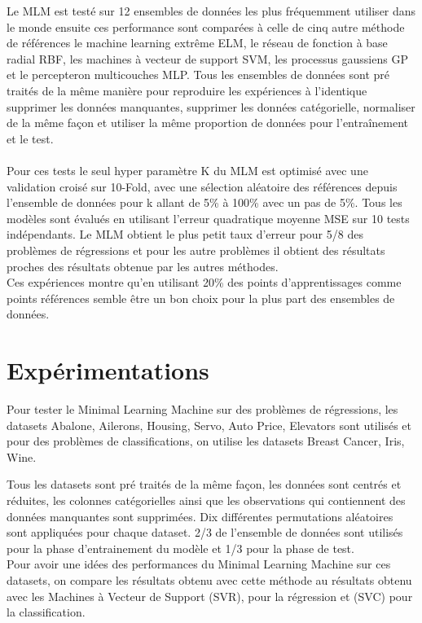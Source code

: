 \documentclass[12pt,a4paper]{report}
\begin{document}
\par Le MLM est testé sur 12 ensembles de données les plus fréquemment utiliser dans le monde ensuite ces performance sont comparées à celle de cinq autre  méthode de références le machine learning extrême ELM, le réseau de fonction à base radial RBF, les machines à vecteur de support SVM, les processus gaussiens GP et le percepteron multicouches MLP. Tous les ensembles de données sont pré traités de la même manière pour reproduire les expériences à l'identique supprimer les données manquantes, supprimer les données catégorielle, normaliser de la même façon et utiliser la même proportion de données pour l'entraînement et le test. \\ \\
Pour ces tests le seul hyper paramètre K du MLM est optimisé avec une validation croisé sur 10-Fold, avec une sélection aléatoire des références depuis l'ensemble de données pour k allant de 5\% à 100\% avec un pas de 5\%. Tous les modèles sont évalués en utilisant l'erreur quadratique moyenne MSE sur 10 tests indépendants. Le MLM obtient le plus petit taux d'erreur pour 5/8 des problèmes de régressions et pour les autre problèmes il obtient des résultats proches des résultats obtenue par les autres méthodes.\\
Ces expériences montre qu'en utilisant 20\% des points d'apprentissages comme points références semble être un bon choix pour la plus part des ensembles de données.

{\color{MidnightBlue}\chapter{Expérimentations}}
\par Pour tester le Minimal Learning Machine sur des problèmes de régressions, les datasets Abalone, Ailerons, Housing, Servo, Auto Price, Elevators sont utilisés  et pour des problèmes de classifications, on utilise les datasets Breast Cancer, Iris, Wine.

\par Tous les datasets sont pré traités de la même façon, les données sont centrés et réduites, les colonnes catégorielles ainsi que les observations qui contiennent des données manquantes sont supprimées. Dix différentes permutations aléatoires sont appliquées pour chaque dataset. 2/3 de l'ensemble de données sont utilisés pour la phase d'entrainement du modèle et 1/3 pour la phase de test.\\
Pour avoir une idées des performances du Minimal Learning Machine sur ces datasets, on compare les résultats obtenu avec cette méthode au résultats obtenu avec les Machines à Vecteur de Support (SVR), pour la régression et (SVC) pour la classification.
\end{document}

